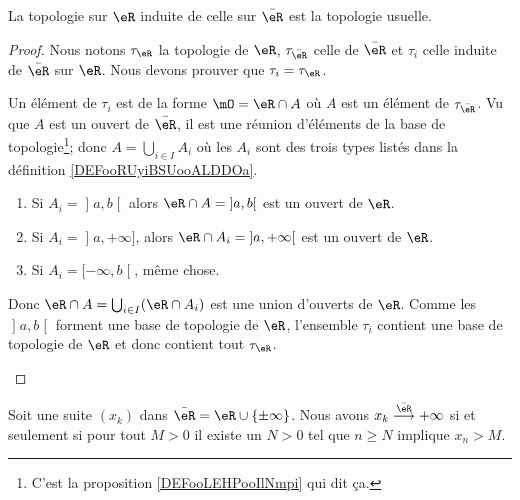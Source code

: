 \begin{lemma}
	La topologie sur \( \eR\) induite de celle sur \( \bar \eR\) est la topologie usuelle.
\end{lemma}

\begin{proof}
	Nous notons \( \tau_{\eR}\) la topologie de \( \eR\), \( \tau_{\bar \eR}\) celle de \( \bar \eR\) et \( \tau_i\) celle induite de \( \bar \eR\) sur \( \eR\). Nous devons prouver que \( \tau_i=\tau_{\eR}\).

	\begin{subproof}
		Un élément de \( \tau_i\) est de la forme \( \mO=\eR\cap A\) où \( A\) est un élément de \( \tau_{\bar \eR}\). Vu que \( A\) est un ouvert de \( \bar \eR\), il est une réunion d'éléments de la base de topologie\footnote{C'est la proposition \ref{DEFooLEHPooIlNmpi} qui dit ça.}; donc \( A=\bigcup_{i\in I}A_i\) où les \( A_i\) sont des trois types listés dans la définition \ref{DEFooRUyiBSUooALDDOa}.
		\begin{enumerate}
			\item
			      Si \( A_i=\mathopen] a , b \mathclose[\) alors \( \eR\cap A=\mathopen] a , b \mathclose[\) est un ouvert de \( \eR\).
			\item Si \( A_i=\mathopen] a , +\infty \mathclose]\), alors \( \eR\cap A_i=\mathopen] a , +\infty \mathclose[\) est un ouvert de \( \eR\).
			\item Si \( A_i=\mathopen[ -\infty , b \mathclose[\), même chose.
		\end{enumerate}
		Donc \( \eR\cap A=\bigcup_{i\in I}(\eR\cap A_i)\) est une union d'ouverts de \( \eR\).
		Comme les \( \mathopen] a , b \mathclose[\) forment une base de topologie de \( \eR\), l'ensemble \( \tau_i\) contient une base de topologie de \( \eR\) et donc contient tout \( \tau_{\eR}\).
	\end{subproof}
\end{proof}

\begin{proposition}
	Soit une suite \( (x_k)\) dans \( \bar \eR=\eR\cup\{ \pm\infty \}\). Nous avons \( x_k\stackrel{\bar \eR}{\longrightarrow}+\infty\) si et seulement si pour tout \( M>0\) il existe un \( N>0\) tel que \( n\geq N\) implique \( x_n>M\).
\end{proposition}

